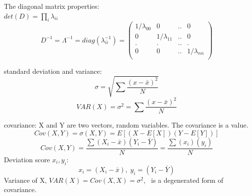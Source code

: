 \documentclass[a4paper,12pt]{article}
\begin{document}
\begin{compactitem}
\item The diagonal matrix properties:\\
$det(D) = \prod_{i}^{} \lambda_{ii}$\\
\begin{equation}
\label{eq:pdpI}
D^{-1}=\Lambda^{-1}=diag(\lambda_{ii}^{-1})=
\begin{pmatrix}
       1/\lambda_{00}& 0 				& ..	&	0 	\\[0.3em]
       0 			& 1/\lambda_{11} & ..		&	0 	\\[0.3em]
       .			& .				& ..	&	.	\\[0.3em]
       0 			& 0 			& ..	&	1/\lambda_{nn}\\[0.3em]
\end{pmatrix}
\end{equation}
\item standard deviation and variance:
\begin{equation}
\label{eq:std}
\sigma = \sqrt {\sum \frac{(x-\bar{x})^2}{N}}
\end{equation}
\begin{equation}
\label{eq:variance}
VAR(X)=\sigma^{2} = {\sum \frac{(x-\bar{x})^2}{N}}
\end{equation}

\item covariance: X and Y are two vectors, random variables. The covariance is a value.
\begin{equation}
\label{eq:covar}
Cov(X,Y)=\sigma(X,Y)=E[(X - E[X])(Y-E[Y])]
\end{equation}
\begin{equation}
\label{eq:covar1}
Cov(X,Y)=\frac{\sum(X_i-\bar{x})(Y_i-\bar{Y})}{N}=
\frac{\sum(x_i)(y_i)}{N}
\end{equation}
Deviation score $x_i, y_i$:
\begin{equation}
\label{eq:covar1}
x_{i}=(X_i-\bar{x}),\;
y_{i}=(Y_i-\bar{Y})
\end{equation}
Variance of X, $VAR(X)=Cov(X,X)=\sigma^{2}$, \ is a degenerated form of covariance.\\


\end{compactitem}
\end{document}
